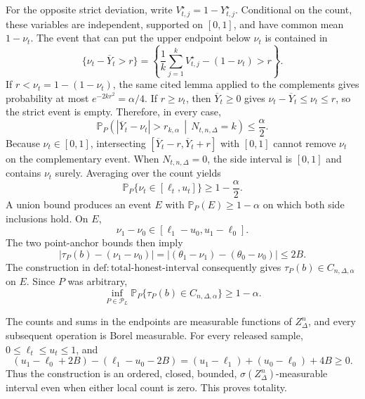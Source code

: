 For the opposite strict deviation, write \(V_{t,j}^{\star}=1-Y_{t,j}^{\star}\).  Conditional on the count, these variables are independent, supported on \([0,1]\), and have common mean \(1-\nu_t\).  The event that can put the upper endpoint below \(\nu_t\) is contained in
\[
 \{\nu_t-\overline Y_t>r\}
 =\left\{\frac1k\sum_{j=1}^kV_{t,j}^{\star}-(1-\nu_t)>r\right\}.
\]
If \(r<\nu_t=1-(1-\nu_t)\), the same cited lemma applied to the complements gives probability at most \(e^{-2kr^2}=\alpha/4\).  If \(r\geq\nu_t\), then \(\overline Y_t\geq0\) gives \(\nu_t-\overline Y_t\leq\nu_t\leq r\), so the strict event is empty.  Therefore, in every case,
\[
 \mathbb P_P\!\left(|\overline Y_t-\nu_t|>r_{k,\alpha}\,\middle|\,N_{t,n,\Delta}=k\right)
 \leq\frac\alpha2.
\]
Because \(\nu_t\in[0,1]\), intersecting \([\overline Y_t-r,\overline Y_t+r]\) with \([0,1]\) cannot remove \(\nu_t\) on the complementary event.  When \(N_{t,n,\Delta}=0\), the side interval is \([0,1]\) and contains \(\nu_t\) surely.  Averaging over the count yields
\[
 \mathbb P_P\{\nu_t\in[\ell_t,u_t]\}\geq1-\frac\alpha2.
\]
A union bound produces an event \(E\) with \(\mathbb P_P(E)\geq1-\alpha\) on which both side inclusions hold.  On \(E\),
\[
 \nu_1-\nu_0\in[\ell_1-u_0,u_1-\ell_0].
\]
The two point-anchor bounds then imply
\[
 |\tau_P(b)-(\nu_1-\nu_0)|
 =| (\theta_1-\nu_1)-(\theta_0-\nu_0)|
 \leq2B.
\]
The construction in \(\mathrm{def:total\text{-}honest\text{-}interval}\) consequently gives \(\tau_P(b)\in C_{n,\Delta,\alpha}\) on \(E\).  Since \(P\) was arbitrary,
\[
 \inf_{P\in\mathcal P_L}\mathbb P_P\{\tau_P(b)\in C_{n,\Delta,\alpha}\}\geq1-\alpha.
\]

The counts and sums in the endpoints are measurable functions of \(Z_\Delta^n\), and every subsequent operation is Borel measurable.  For every released sample, \(0\leq\ell_t\leq u_t\leq1\), and
\[
 (u_1-\ell_0+2B)-(\ell_1-u_0-2B)
 =(u_1-\ell_1)+(u_0-\ell_0)+4B\geq0.
\]
Thus the construction is an ordered, closed, bounded, \(\sigma(Z_\Delta^n)\)-measurable interval even when either local count is zero.  This proves totality.

